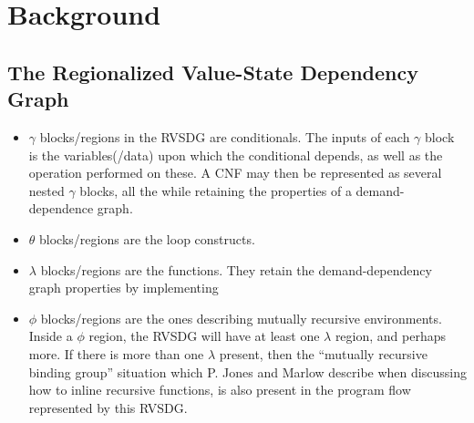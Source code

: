 
\section{Background}

\subsection{The Regionalized Value-State Dependency Graph}
\label{background:RVSDG}

\begin{itemize}

	\item \textit{$\gamma$} blocks/regions in the RVSDG are conditionals. The
inputs of each $\gamma$ block is the variables(/data) upon which the conditional
depends, as well as the operation performed on these. A CNF may then be
represented as several nested $\gamma$ blocks, all the while retaining the
properties of a demand-dependence graph.

	\item \textit{$\theta$} blocks/regions are the loop constructs.

	\item \textit{$\lambda$} blocks/regions are the functions. They retain the
demand-dependency graph properties by implementing

	\item \textit{$\phi$} blocks/regions are the ones describing mutually
recursive environments. Inside a $\phi$ region, the RVSDG will have at least one
$\lambda$ region, and perhaps more. If there is more than one $\lambda$ present,
then the ``mutually recursive binding group'' situation which P. Jones and
Marlow \cite{GHC-paper} describe when discussing how to inline recursive
functions, is also present in the program flow represented by this RVSDG.

\end{itemize}
